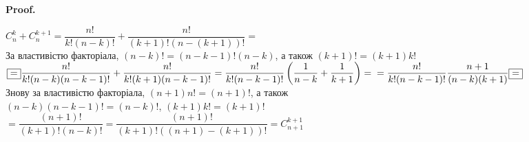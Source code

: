 \documentclass[a4paper, 14pt]{article}
\makeatletter
\def\qed{$\blacksquare$}
\theoremstyle{theoremdd}
\theoremstyle{theoremdd}
\theoremstyle{theoremdd}
\theoremstyle{theoremdd}
\theoremstyle{theoremdd}
\theoremstyle{theoremdd}
\theoremstyle{theoremdd}
\theoremstyle{theoremdd}
\renewenvironment{proof}[1][Proof.\\]{\par
\pushQED{\hfill \qed}%
\normalfont \topsep6\p@\@plus6\p@\relax
\trivlist
\item\relax
{\bfseries
#1\@addpunct{.}}\hspace\labelsep\ignorespaces
}{%
\popQED\endtrivlist\@endpefalse
}
\makeatother
\begin{document}
	\begin{proof}
	$C_n^k + C_n^{k+1} = \dfrac{n!}{k!(n-k)!} + \dfrac{n!}{(k+1)!(n-(k+1))!} \boxed{=}$\\
	За властивістю факторіала, $(n-k)! = (n-k-1)!(n-k)$, а також $(k+1)! = (k+1)k!$\\
	$\boxed{=} \dfrac{n!}{k!(n-k)(n-k-1)!} + \dfrac{n!}{k!(k+1)(n-k-1)!} = \dfrac{n!}{k!(n-k-1)!} \left(\dfrac{1}{n-k} + \dfrac{1}{k+1} \right) = \\ = \dfrac{n!}{k!(n-k-1)!} \dfrac{n+1}{(n-k)(k+1)} \boxed{=}$\\
	Знову за властивістю факторіала, $(n+1)n! = (n+1)!$, а також \\ $(n-k)(n-k-1)! = (n-k)!$, $(k+1)k! = (k+1)!$ \\
	$\boxed{=} \dfrac{(n+1)!}{(k+1)!(n-k)!} = \dfrac{(n+1)!}{(k+1)!((n+1)-(k+1))!} = C_{n+1}^{k+1}$
	\end{proof}
	
\end{document}
